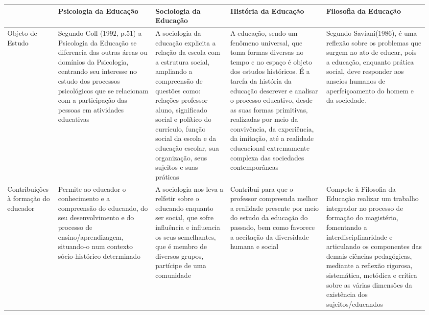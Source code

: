 \documentclass[a4paper, 12pt]{article}
\begin{document}
    \begin{tabular}{|m{2.5cm}|m{3cm}|m{3cm}|m{3cm}|m{3cm}|}
      \hline
       & Psicologia da Educação & Sociologia da Educação & História da Educação & Filosofia da Educação\\
      \hline
      Objeto de Estudo & Segundo Coll (1992, p.51) a Psicologia da Educação se diferencia das outras áreas ou domínios da Psicologia, centrando seu interesse no estudo dos processos psicológicos que se relacionam com a participação das pessoas em atividades educativas & A sociologia da educação explicita a relação da escola com a estrutura social, ampliando a compreensão de questões como: relações professor-aluno, significado social e político do currículo, função social da escola e da educação escolar, sua organização, seus sujeitos e suas práticas & A educação, sendo um fenômeno universal, que toma formas diversas no tempo e no espaço é objeto dos estudos históricos. É a tarefa da história da educação descrever e analisar o processo educativo, desde as suas formas primitivas, realizadas por meio da convivência, da experiência, da imitação, até a realidade educacional extremamente complexa das sociedades contemporâneas & Segundo Saviani(1986), é uma reflexão sobre os problemas que surgem no ato de educar, pois a educação, enquanto prática social, deve responder aos anseios humanos de aperfeiçoamento do homem e da sociedade. \\
      \hline
      Contribuições à formação do educador & Permite ao educador o conhecimento e a compreensão do educando, do seu desenvolvimento e do processo de ensino/aprendizagem, situando-o num contexto sócio-histórico determinado & A sociologia nos leva a relfetir sobre o educando enquanto ser social, que sofre influência e influencia os seus semelhantes, que é membro de diversos grupos, partícipe de uma comunidade & Contribui para que o professor compreenda melhor a realidade presente por meio do estudo da educação do passado, bem como favorece a aceitação da diversidade humana e social & Compete à Filosofia da Educação realizar um trabalho integrador no processo de formação do magistério, fomentando a interdisciplinaridade e articulando os componentes das demais ciências pedagógicas, mediante a reflexão rigorosa, sistemática, metódica e crítica sobre as várias dimensões da existência dos sujeitos/educandos
      \hline
    \end{tabular}
\end{document}
